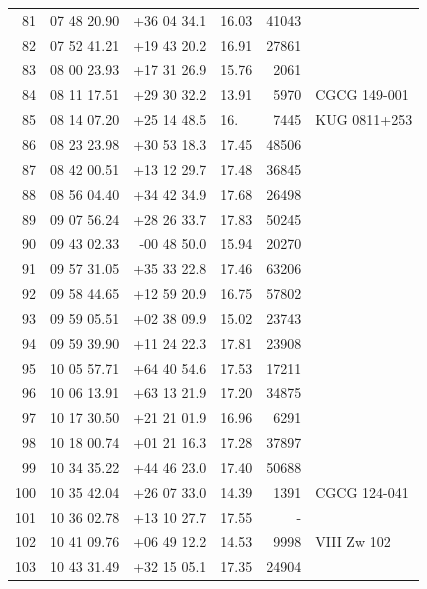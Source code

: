 \documentclass[useAMS,usenatbib]{mn2e}
\begin{document}
\begin{table}
\begin{tabular}{rrrlrl}
  81 &  07 48 20.90 & +36 04 34.1 &  16.03 &  41043 &                  \\
  82 &  07 52 41.21 & +19 43 20.2 &  16.91 &  27861 &                  \\
  83 &  08 00 23.93 & +17 31 26.9 &  15.76 &   2061 &                  \\
  84 &  08 11 17.51 & +29 30 32.2 &  13.91 &   5970 &      CGCG 149-001\\
  85 &  08 14 07.20 & +25 14 48.5 &    16. &   7445 &    KUG 0811+253  \\
  86 &  08 23 23.98 & +30 53 18.3 &  17.45 &  48506 &                  \\
  87 &  08 42 00.51 & +13 12 29.7 &  17.48 &  36845 &                  \\
  88 &  08 56 04.40 & +34 42 34.9 &  17.68 &  26498 &                  \\
  89 &  09 07 56.24 & +28 26 33.7 &  17.83 &  50245 &                  \\
  90 &  09 43 02.33 & -00 48 50.0 &  15.94 &  20270 &                  \\
  91 &  09 57 31.05 & +35 33 22.8 &  17.46 &  63206 &                  \\
  92 &  09 58 44.65 & +12 59 20.9 &  16.75 &  57802 &                  \\
  93 &  09 59 05.51 & +02 38 09.9 &  15.02 &  23743 &                  \\
  94 &  09 59 39.90 & +11 24 22.3 &  17.81 &  23908 &                  \\
  95 &  10 05 57.71 & +64 40 54.6 &  17.53 &  17211 &                  \\
  96 &  10 06 13.91 & +63 13 21.9 &  17.20 &  34875 &                  \\
  97 &  10 17 30.50 & +21 21 01.9 &  16.96 &   6291 &                  \\
  98 &  10 18 00.74 & +01 21 16.3 &  17.28 &  37897 &                  \\
  99 &  10 34 35.22 & +44 46 23.0 &  17.40 &  50688 &                  \\
 100 &  10 35 42.04 & +26 07 33.0 &  14.39 &   1391 &    CGCG 124-041  \\
 101 &  10 36 02.78 & +13 10 27.7 &  17.55 &      - &                  \\
 102 &  10 41 09.76 & +06 49 12.2 &  14.53 &   9998 &      VIII Zw 102 \\
 103 &  10 43 31.49 & +32 15 05.1 &  17.35 &  24904 &                  \\

\end{tabular}
\end{table}
\end{document}
